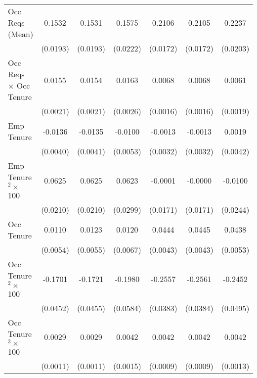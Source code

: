 {\begin{longtable}{l*{6}{c}}
Occ Reqs (Mean)     &      0.1532\sym{***}&      0.1531\sym{***}&      0.1575\sym{***}&      0.2106\sym{***}&      0.2105\sym{***}&      0.2237\sym{***}\\
                    &    (0.0193)         &    (0.0193)         &    (0.0222)         &    (0.0172)         &    (0.0172)         &    (0.0203)         \\
Occ Reqs $\times$ Occ Tenure&      0.0155\sym{***}&      0.0154\sym{***}&      0.0163\sym{***}&      0.0068\sym{***}&      0.0068\sym{***}&      0.0061\sym{***}\\
                    &    (0.0021)         &    (0.0021)         &    (0.0026)         &    (0.0016)         &    (0.0016)         &    (0.0019)         \\
Emp Tenure          &     -0.0136\sym{***}&     -0.0135\sym{***}&     -0.0100\sym{*}  &     -0.0013         &     -0.0013         &      0.0019         \\
                    &    (0.0040)         &    (0.0041)         &    (0.0053)         &    (0.0032)         &    (0.0032)         &    (0.0042)         \\
Emp Tenure$^2\times$ 100&      0.0625\sym{***}&      0.0625\sym{***}&      0.0623\sym{**} &     -0.0001         &     -0.0000         &     -0.0100         \\
                    &    (0.0210)         &    (0.0210)         &    (0.0299)         &    (0.0171)         &    (0.0171)         &    (0.0244)         \\
Occ Tenure          &      0.0110\sym{**} &      0.0123\sym{**} &      0.0120\sym{*}  &      0.0444\sym{***}&      0.0445\sym{***}&      0.0438\sym{***}\\
                    &    (0.0054)         &    (0.0055)         &    (0.0067)         &    (0.0043)         &    (0.0043)         &    (0.0053)         \\
Occ Tenure$^2\times$ 100&     -0.1701\sym{***}&     -0.1721\sym{***}&     -0.1980\sym{***}&     -0.2557\sym{***}&     -0.2561\sym{***}&     -0.2452\sym{***}\\
                    &    (0.0452)         &    (0.0455)         &    (0.0584)         &    (0.0383)         &    (0.0384)         &    (0.0495)         \\
Occ Tenure$^3\times$ 100&      0.0029\sym{***}&      0.0029\sym{***}&      0.0042\sym{***}&      0.0042\sym{***}&      0.0042\sym{***}&      0.0042\sym{***}\\
                    &    (0.0011)         &    (0.0011)         &    (0.0015)         &    (0.0009)         &    (0.0009)         &    (0.0013)         \\

\end{longtable}}
